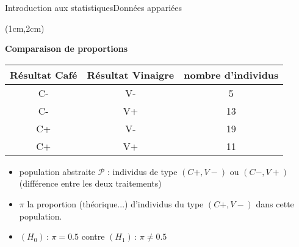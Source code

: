 \documentclass{beamer}
\begin{document}
\begin{frame}{Introduction aux statistiques}{Données appariées}
\begin{textblock*}{\textwidth}(1cm,2cm)

\begin{center}{\bf \Large Comparaison de proportions } \end{center}



 
\begin{center}
\begin{tabular}{|c|c|c|}
\hline
Résultat Café & Résultat Vinaigre & nombre d'individus \\
\hline
C- & V- & 5 \\
\hline
C- & V+ &  13\\
\hline
C+ & V- &   19\\
\hline 
C+ & V+ &   11 \\
\hline
\end{tabular}
\end{center}

\begin{itemize}
\item population abstraite $\mathcal{P}$ : individus de type 
$(C+,V-)$ ou  $(C-,V+)$ (différence entre les deux traitements)
\item  $\pi$ la proportion (théorique...) d'individus  du type $(C+,V-)$ dans cette population.
\item  $(H_0)\,: \, \pi=0.5$ contre $(H_1)\,: \, \pi\neq 0.5$ 
\end{itemize}
\end{textblock*}

\end{frame}


\end{document}

